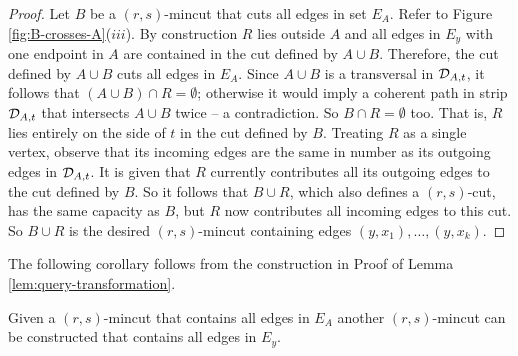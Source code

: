 \begin{proof}
Let $B$ be a $(r,s)$-mincut that cuts all edges in set $E_A$.
Refer to Figure \ref{fig:B-crosses-A}($iii$). By construction $R$ lies outside $A$ 
and all edges in $E_y$ with one endpoint in $A$ are contained in the cut defined by $A\cup B$.
 Therefore, the cut defined by $A\cup B$ cuts all edges in $E_A$.
Since $A\cup B$ is a transversal in ${\cal D}_{A,t}$, it follows that $(A\cup B) \cap R = \emptyset$; otherwise it would imply a coherent path in strip ${\cal D}_{A,t}$ that intersects $A\cup B$ twice -- a contradiction. So $B \cap R = \emptyset$ too. That is, $R$ lies entirely on the side of $t$ in the cut defined by $B$. Treating $R$ as a single vertex, observe that its incoming edges are the same in number as its outgoing edges in ${\cal D}_{A,t}$. It is given that $R$ currently contributes all its outgoing edges to the cut defined by $B$. So it follows that $B\cup R$, which also defines a $(r,s)$-cut, has the same capacity as $B$, but $R$ now contributes all incoming edges to this cut. 
 So $B\cup R$ is the desired $(r,s)$-mincut containing edges $(y,x_1),\ldots,(y,x_k)$.
\end{proof}


The following corollary follows from the construction in Proof of Lemma \ref{lem:query-transformation}.

\begin{corollary}
\label{cor:query-transformation}
Given a $(r,s)$-mincut that contains all edges in $E_A$ another $(r,s)$-mincut can be constructed that contains all edges in $E_y$.
\end{corollary}
